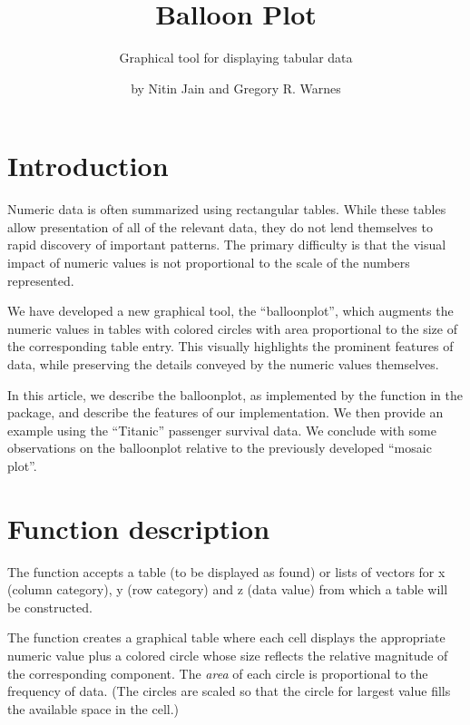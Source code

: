 \documentclass[a4paper]{report}
\begin{document}
\begin{article}
\title{Balloon Plot}
\subtitle{Graphical tool for displaying tabular data}
\author{by Nitin Jain and Gregory R. Warnes}

\maketitle

\section*{Introduction}

Numeric data is often summarized using rectangular tables. While
these tables allow presentation of all of the relevant data, they do
not lend themselves to rapid discovery of important patterns. The
primary difficulty is that the visual impact of numeric values is
not proportional to the scale of the numbers represented.

We have developed a new graphical tool, the ``balloonplot'',
which augments the numeric values in tables with colored circles
with area proportional to the size of the corresponding table
entry. This visually highlights the prominent features of
data, while preserving the details conveyed by the numeric values
themselves.

In this article, we describe the balloonplot, as implemented by the
 function in the  package, and
describe the features of our implementation.  We then provide an
example using the ``Titanic'' passenger survival data.  We conclude
with some observations on the balloonplot relative to the
previously developed ``mosaic plot''.

\section*{Function description}

The  function accepts a table (to be displayed as
found) or lists of vectors for x (column category), y (row category)
and z (data value) from which a table will be constructed.

The  function creates a graphical table
where each cell displays the appropriate numeric value plus a
colored circle whose size reflects the relative magnitude of the
corresponding component. The
\emph{area} of each circle is proportional to the frequency of
data. (The circles are scaled so that the circle for largest value
fills the available space in the cell.)



\end{article}
\end{document}
